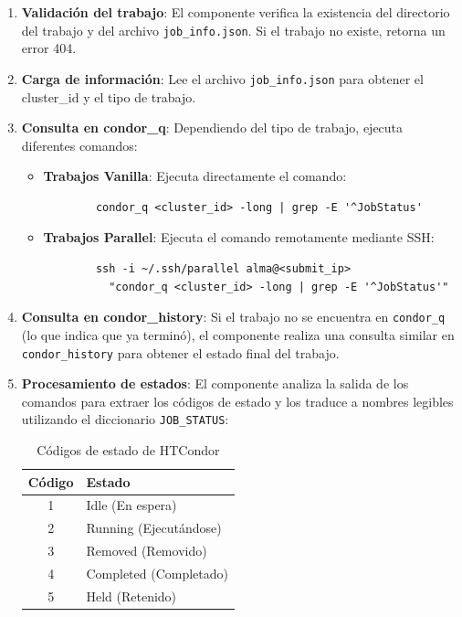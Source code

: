 \begin{enumerate}
	\item \textbf{Validación del trabajo}: El componente verifica la existencia del directorio del trabajo y del archivo \texttt{job\_info.json}. Si el trabajo no existe, retorna un error 404.
	
	\item \textbf{Carga de información}: Lee el archivo \texttt{job\_info.json} para obtener el cluster\_id y el tipo de trabajo.
	
	\item \textbf{Consulta en condor\_q}: Dependiendo del tipo de trabajo, ejecuta diferentes comandos:
	
	\begin{itemize}
		\item \textbf{Trabajos Vanilla}: Ejecuta directamente el comando:
		\begin{verbatim}
		condor_q <cluster_id> -long | grep -E '^JobStatus'
		\end{verbatim}
		
		\item \textbf{Trabajos Parallel}: Ejecuta el comando remotamente mediante SSH:
		\begin{verbatim}
		ssh -i ~/.ssh/parallel alma@<submit_ip> 
		  "condor_q <cluster_id> -long | grep -E '^JobStatus'"
		\end{verbatim}
	\end{itemize}
	
	\item \textbf{Consulta en condor\_history}: Si el trabajo no se encuentra en \texttt{condor\_q} (lo que indica que ya terminó), el componente realiza una consulta similar en \texttt{condor\_history} para obtener el estado final del trabajo.
	
	\item \textbf{Procesamiento de estados}: El componente analiza la salida de los comandos para extraer los códigos de estado y los traduce a nombres legibles utilizando el diccionario \texttt{JOB\_STATUS}:
	
	\begin{table}[H]
		\centering
		\begin{tabular}{|c|l|}
			\hline
			\textbf{Código} & \textbf{Estado} \\
			\hline
			1 & Idle (En espera) \\
			2 & Running (Ejecutándose) \\
			3 & Removed (Removido) \\
			4 & Completed (Completado) \\
			5 & Held (Retenido) \\
			\hline
		\end{tabular}
		\caption{Códigos de estado de HTCondor}
		\label{tab:job-status-codes}
	\end{table}
	

\end{enumerate}
